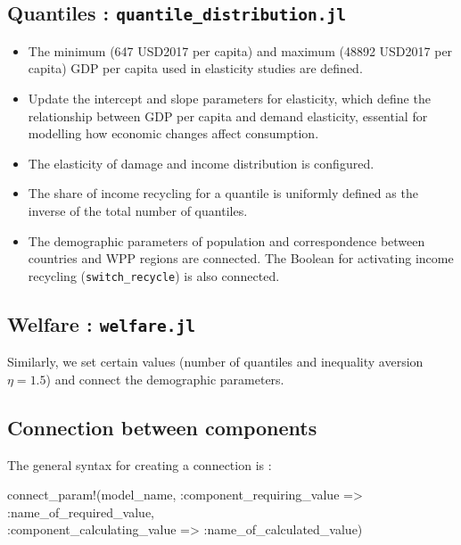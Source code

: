 \documentclass[
]{article}
\newenvironment{Shaded}{}{}
\newcommand{\FunctionTok}[1]{\textcolor[rgb]{0.02,0.16,0.49}{#1}}
\newcommand{\NormalTok}[1]{#1}
\newcommand{\OperatorTok}[1]{\textcolor[rgb]{0.40,0.40,0.40}{#1}}
\providecommand{\tightlist}{%
  \setlength{\itemsep}{0pt}\setlength{\parskip}{0pt}}
\begin{document}
\subsection{\texorpdfstring{Quantiles :
\texttt{quantile\_distribution.jl}}{Quantiles : quantile\_distribution.jl}}\label{quantiles-quantile_distribution.jl}

\begin{itemize}
\tightlist
\item
  The minimum (647 USD2017 per capita) and maximum (48892 USD2017 per
  capita) GDP per capita used in elasticity studies are defined.
\item
  Update the intercept and slope parameters for elasticity, which define
  the relationship between GDP per capita and demand elasticity,
  essential for modelling how economic changes affect consumption.
\item
  The elasticity of damage and income distribution is configured.
\item
  The share of income recycling for a quantile is uniformly defined as
  the inverse of the total number of quantiles.

\item
  The demographic parameters of population and correspondence between
  countries and WPP regions are connected. The Boolean for activating
  income recycling (\texttt{switch\_recycle}) is also connected.
\end{itemize}

\subsection{\texorpdfstring{Welfare :
\texttt{welfare.jl}}{Welfare : welfare.jl}}\label{welfare-welfare.jl}

Similarly, we set certain values (number of quantiles and inequality
aversion \(\eta = 1.5\)) and connect the demographic parameters.

\subsection{Connection between
components}\label{connection-between-components}

The general syntax for creating a connection is :

\begin{Shaded}
\begin{Highlighting}[]
\FunctionTok{connect\_param!}\NormalTok{(model\_name, }\OperatorTok{:}\NormalTok{component\_requiring\_value }\OperatorTok{=\textgreater{}} \OperatorTok{:}\NormalTok{name\_of\_required\_value, } \\
\OperatorTok{:}\NormalTok{component\_calculating\_value }\OperatorTok{=\textgreater{}} \OperatorTok{:}\NormalTok{name\_of\_calculated\_value)}
\end{Highlighting}
\end{Shaded}
\end{document}
